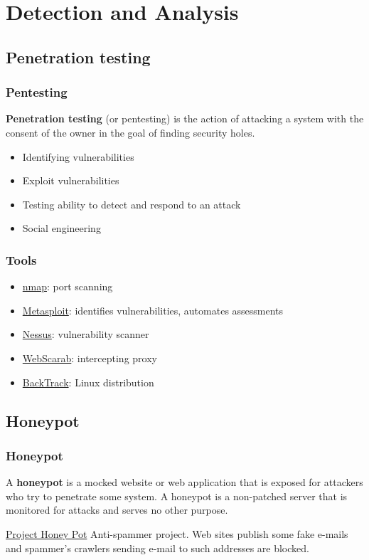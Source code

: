 \section{Detection and Analysis}

\subsection{Penetration testing}

\begin{frame}
\frametitle{Pentesting}
\textbf{Penetration testing} (or pentesting) is the action of attacking a
system with the consent of the owner in the goal of finding security holes.
\begin{itemize}
\item Identifying vulnerabilities
\item Exploit vulnerabilities
\item Testing ability to detect and respond to an attack
\item Social engineering
\end{itemize}
\end{frame}

\begin{frame}
\frametitle{Tools}
\begin{itemize}
\item \href{http://nmap.org/}{nmap}:
	port scanning
\item \href{http://www.metasploit.com/about/penetration-testing-basics/}{Metasploit}:
	identifies vulnerabilities, automates assessments
\item \href{http://www.tenable.com/products/nessus}{Nessus}:
	vulnerability scanner
\item \href{https://www.owasp.org/index.php/Webscarab}{WebScarab}:
	intercepting proxy
\item \href{http://www.backtrack-linux.org/}{BackTrack}:
	Linux distribution
\end{itemize}
\end{frame}

\subsection{Honeypot}

\begin{frame}
\frametitle{Honeypot}
A \textbf{honeypot} is a mocked website or web application that is exposed for
attackers who try to penetrate some system. A honeypot is a non-patched server
that is monitored for attacks and serves no other purpose.
\begin{exampleblock}{\href{https://www.projecthoneypot.org/about_us.php}{Project Honey Pot}}
Anti-spammer project.
Web sites publish some fake e-mails and spammer's crawlers sending e-mail to
such addresses are blocked.
\end{exampleblock}
\end{frame}

